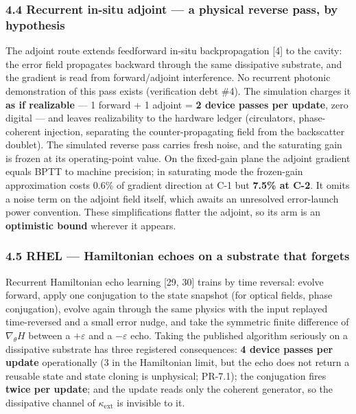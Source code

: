 \documentclass[
  10pt,
]{article}
\begin{document}
\subsubsection{4.4 Recurrent in-situ adjoint --- a physical reverse
pass, by
hypothesis}\label{recurrent-in-situ-adjoint-a-physical-reverse-pass-by-hypothesis}

The adjoint route extends feedforward in-situ backpropagation {[}4{]} to
the cavity: the error field propagates backward through the same
dissipative substrate, and the gradient is read from forward/adjoint
interference. No recurrent photonic demonstration of this pass exists
(verification debt \#4). The simulation charges it \textbf{as if
realizable} --- 1 forward + 1 adjoint = \textbf{2 device passes per
update}, zero digital --- and leaves realizability to the hardware
ledger (circulators, phase-coherent injection, separating the
counter-propagating field from the backscatter doublet). The simulated
reverse pass carries fresh noise, and the saturating gain is frozen at
its operating-point value. On the fixed-gain plane the adjoint gradient
equals BPTT to machine precision; in saturating mode the frozen-gain
approximation costs 0.6\% of gradient direction at C-1 but \textbf{7.5\%
at C-2}. It omits a noise term on the adjoint field itself, which awaits
an unresolved error-launch power convention. These simplifications
flatter the adjoint, so its arm is an \textbf{optimistic bound} wherever
it appears.

\subsubsection{4.5 RHEL --- Hamiltonian echoes on a substrate that
forgets}\label{rhel-hamiltonian-echoes-on-a-substrate-that-forgets}

Recurrent Hamiltonian echo learning {[}29, 30{]} trains by time
reversal: evolve forward, apply one conjugation to the state snapshot
(for optical fields, phase conjugation), evolve again through the same
physics with the input replayed time-reversed and a small error nudge,
and take the symmetric finite difference of \(\nabla_\theta H\) between
a \(+\varepsilon\) and a \(-\varepsilon\) echo. Taking the published
algorithm seriously on a dissipative substrate has three registered
consequences: \textbf{4 device passes per update} operationally (3 in
the Hamiltonian limit, but the echo does not return a reusable state and
state cloning is unphysical; PR-7.1); the conjugation fires
\textbf{twice per update}; and the update reads only the coherent
generator, so the dissipative channel of \(\kappa_\text{ext}\) is
invisible to it.
\end{document}
